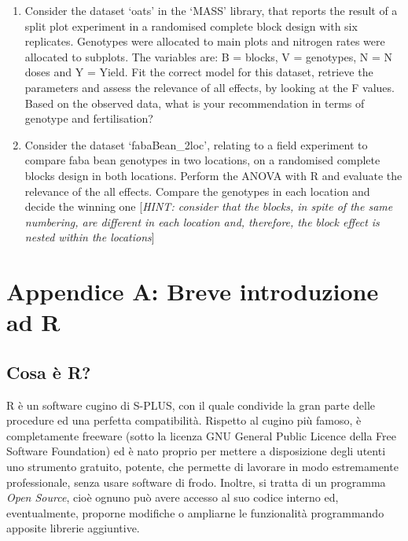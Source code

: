 \documentclass[
  12pt,
]{book}
\begin{document}
\begin{enumerate}
\def\labelenumi{\arabic{enumi}.}
\setcounter{enumi}{2}
\item
  Consider the dataset `oats' in the `MASS' library, that reports the result of a split plot experiment in a randomised complete block design with six replicates. Genotypes were allocated to main plots and nitrogen rates were allocated to subplots. The variables are: B = blocks, V = genotypes, N = N doses and Y = Yield. Fit the correct model for this dataset, retrieve the parameters and assess the relevance of all effects, by looking at the F values. Based on the observed data, what is your recommendation in terms of genotype and fertilisation?
\item
  Consider the dataset `fabaBean\_2loc', relating to a field experiment to compare faba bean genotypes in two locations, on a randomised complete blocks design in both locations. Perform the ANOVA with R and evaluate the relevance of the all effects. Compare the genotypes in each location and decide the winning one {[}\emph{HINT: consider that the blocks, in spite of the same numbering, are different in each location and, therefore, the block effect is nested within the locations}{]}
\end{enumerate}

\hypertarget{appendice-a-breve-introduzione-ad-r}{%
\chapter{Appendice A: Breve introduzione ad R}\label{appendice-a-breve-introduzione-ad-r}}

\hypertarget{cosa-uxe8-r}{%
\section*{Cosa è R?}\label{cosa-uxe8-r}}

R è un software cugino di S-PLUS, con il quale condivide la gran parte delle procedure ed una perfetta compatibilità. Rispetto al cugino più famoso, è completamente freeware (sotto la licenza GNU General Public Licence della Free Software Foundation) ed è nato proprio per mettere a disposizione degli utenti uno strumento gratuito, potente, che permette di lavorare in modo estremamente professionale, senza usare software di frodo. Inoltre, si tratta di un programma \emph{Open Source}, cioè ognuno può avere accesso al suo codice interno ed, eventualmente, proporne modifiche o ampliarne le funzionalità programmando apposite librerie aggiuntive.
\end{document}
